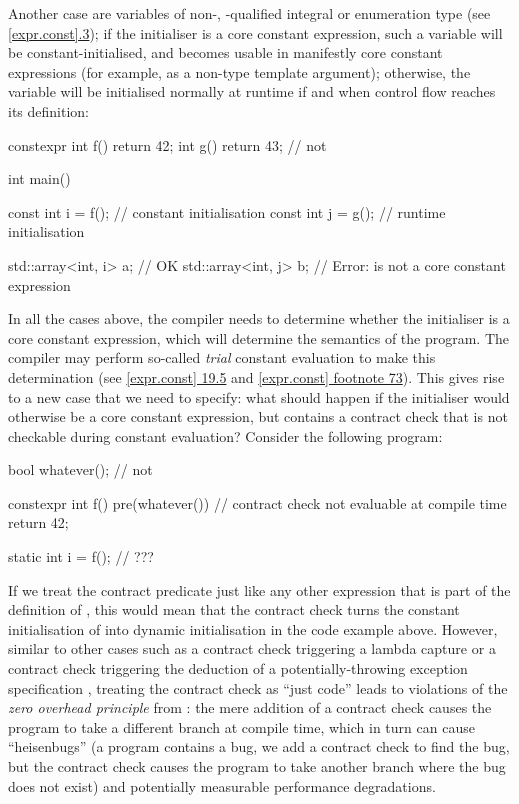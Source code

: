 Another case are variables of non-, -qualified integral or enumeration type (see \href{https://eel.is/c++draft/expr.const#3}{[expr.const].3}); if the initialiser is a core constant expression, such a variable will be constant-initialised, and becomes usable in manifestly core constant expressions (for example, as a non-type template argument); otherwise, the variable will be initialised normally at runtime if and when control flow reaches its definition:

\begin{codeblock}
constexpr int f() { return 42; }
int g() { return 43; }  // not 

int main() {
  const int i = f();   // constant initialisation
  const int j = g();  // runtime initialisation
  
  std::array<int, i> a;  // OK
  std::array<int, j> b;  // Error:  is not a core constant expression
}
\end{codeblock}

In all the cases above, the compiler needs to determine whether the initialiser is a core constant expression, which will determine the semantics of the program. The compiler may perform so-called \emph{trial} constant evaluation to make this determination (see \href{https://eel.is/c++draft/expr.const#19.5}{[expr.const] 19.5} and \href{https://eel.is/c++draft/expr.const#footnote-73}{[expr.const] footnote 73}). This gives rise to a new case that we need to specify: what should happen if the initialiser would otherwise be a core constant expression, but contains a contract check that is not checkable during constant evaluation? Consider the following program:

\begin{codeblock}
bool whatever();     // not 

constexpr int f()
  pre(whatever())    // contract check not evaluable at compile time
{  
  return 42;
}

static int i = f();  // ???
\end{codeblock}

If we treat the contract predicate just like any other expression that is part of the definition of , this would mean that the contract check turns the constant initialisation of  into dynamic initialisation in the code example above. However, similar to other cases such as a contract check triggering a lambda capture \cite{P2890R1} or a contract check triggering the deduction of a potentially-throwing exception specification \cite{P2969R0}, treating the contract check as ``just code'' leads to violations of the \emph{zero overhead principle} from \cite{P2932R1}: the mere addition of a contract check causes the program to take a different branch at compile time, which in turn can cause ``heisenbugs'' (a program contains a bug, we add a contract check to find the bug, but the contract check causes the program to take another branch where the bug does not exist) and potentially measurable performance degradations.

